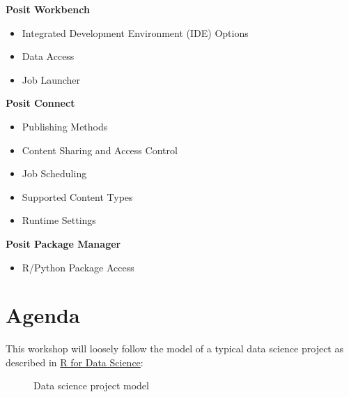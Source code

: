\documentclass[
  letterpaper,
  DIV=11,
  numbers=noendperiod]{scrreprt}
\providecommand{\tightlist}{%
  \setlength{\itemsep}{0pt}\setlength{\parskip}{0pt}}\usepackage{longtable,booktabs,array}
\begin{document}
\textbf{Posit Workbench}

\begin{itemize}
\item
  Integrated Development Environment (IDE) Options
\item
  Data Access
\item
  Job Launcher
\end{itemize}

\textbf{Posit Connect}

\begin{itemize}
\item
  Publishing Methods
\item
  Content Sharing and Access Control
\item
  Job Scheduling
\item
  Supported Content Types
\item
  Runtime Settings
\end{itemize}

\textbf{Posit Package Manager}

\begin{itemize}
\tightlist
\item
  R/Python Package Access
\end{itemize}

\section*{Agenda}\label{agenda}


This workshop will loosely follow the model of a typical data science
project as described in \href{https://r4ds.hadley.nz/}{R for Data
Science}:

\begin{figure}


\caption{\label{fig-data-science-model}Data science project model}

\end{figure}%
\end{document}
